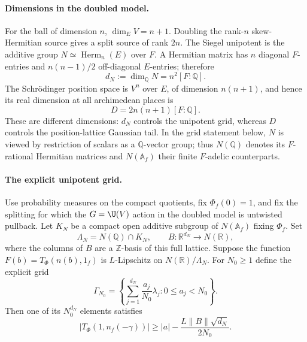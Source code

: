 \documentclass[11pt]{article}
\newcommand{\Q}{\mathbb Q}\newcommand{\C}{\mathbb C}\newcommand{\Z}{\mathbb Z}\newcommand{\R}{\mathbb R}\newcommand{\A}{\mathbb A}\newcommand{\OO}{\mathcal O}
\theoremstyle{definition}\newtheorem{definition}[theorem]{Definition}\newtheorem{remark}[theorem]{Remark}
\begin{document}
\paragraph{Dimensions in the doubled model.}
For the ball of dimension $n$, $\dim_E V=n+1$. Doubling the
rank-$n$ skew-Hermitian source gives a split source of rank $2n$.
The Siegel unipotent is the additive group
$N\simeq\operatorname{Herm}_n(E)$ over $F$. A Hermitian matrix has
$n$ diagonal $F$-entries and $n(n-1)/2$ off-diagonal $E$-entries;
therefore
\[
 d_N:=\dim_\Q N=n^2[F:\Q].
\]
The Schr\"odinger position space is $V^n$ over $E$, of dimension
$n(n+1)$, and hence its real dimension at all archimedean places is
\[
 D=2n(n+1)[F:\Q].
\]
These are different dimensions: $d_N$ controls the unipotent grid,
whereas $D$ controls the position-lattice Gaussian tail.
In the grid statement below, $N$ is viewed by restriction of
scalars as a $\Q$-vector group; thus $N(\Q)$ denotes its
$F$-rational Hermitian matrices and $N(\A_f)$ their finite
$F$-adelic counterparts.

\paragraph{The explicit unipotent grid.}
Use probability measures on the compact quotients, fix
$\Phi_f(0)=1$, and fix the splitting for which the $G=\U(V)$
action in the doubled model is untwisted pullback. Let $K_N$ be
a compact open additive subgroup of $N(\A_f)$ fixing $\Phi_f$.
Set
\[
 \Lambda_N=N(\Q)\cap K_N,
 \qquad B:\R^{d_N}\longrightarrow N(\R),
\]
where the columns of $B$ are a $\Z$-basis of this full lattice.
Suppose the function
$F(b)=T_\Phi(n(b),1_f)$ is $L$-Lipschitz on
$N(\R)/\Lambda_N$. For $N_0\geq1$ define the explicit grid
\[
 \Gamma_{N_0}=
 \left\{\sum_{j=1}^{d_N}\frac{a_j}{N_0}\lambda_j:
                         0\leq a_j<N_0\right\}.
\]
Then one of its $N_0^{d_N}$ elements satisfies
\begin{equation}\label{Q10-grid}
 |T_\Phi(1,n_f(-\gamma))|
    \geq |a|-\frac{L\|B\|\sqrt{d_N}}{2N_0}.
\end{equation}
\end{document}
